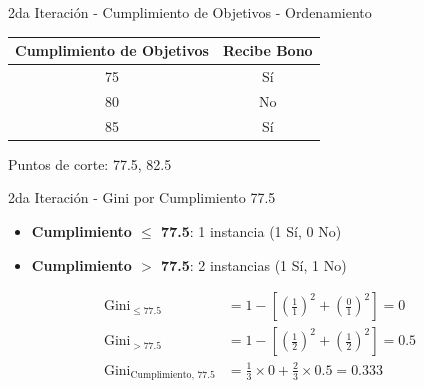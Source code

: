 \documentclass{beamer}
\begin{document}
\begin{frame}{2da Iteración - Cumplimiento de Objetivos - Ordenamiento}
    \begin{center}
        \begin{tabular}{cc}
            \toprule
            Cumplimiento de Objetivos & Recibe Bono \\
            \midrule
            75 & Sí \\
            80 & No \\
            85 & Sí \\
            \bottomrule
        \end{tabular}
    \end{center}
    
    \vspace{1em}
    
    \begin{center}
        \Large Puntos de corte: 77.5, 82.5
    \end{center}
\end{frame}

\begin{frame}{2da Iteración - Gini por Cumplimiento 77.5}
    \begin{itemize}
        \item \textbf{Cumplimiento $\leq$ 77.5}: 1 instancia (1 Sí, 0 No)
        \item \textbf{Cumplimiento $>$ 77.5}: 2 instancias (1 Sí, 1 No)
    \end{itemize}
    
    \vspace{0.5em}
    
    \begin{align*}
        \mathrm{Gini}_{\leq 77.5} &= 1 - \left[\left(\tfrac{1}{1}\right)^2 + \left(\tfrac{0}{1}\right)^2\right] = 0 \\
        \mathrm{Gini}_{> 77.5} &= 1 - \left[\left(\tfrac{1}{2}\right)^2 + \left(\tfrac{1}{2}\right)^2\right] = 0.5 \\
        \mathrm{Gini}_{\text{Cumplimiento, 77.5}} &= \tfrac{1}{3}\times0 + \tfrac{2}{3}\times0.5 = 0.333
    \end{align*}
\end{frame}
\end{document}
